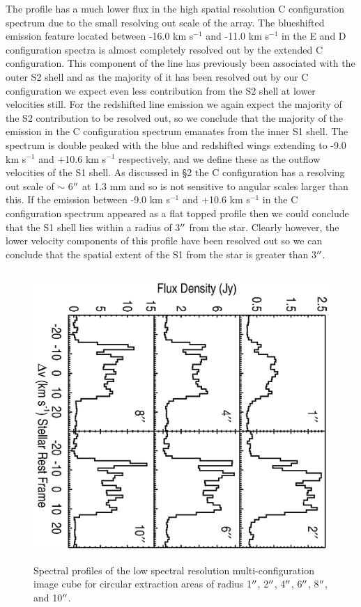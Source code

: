 \documentclass[apj]{emulateapj}
\begin{document}
The profile has a much lower flux in the high spatial resolution C configuration spectrum due to the small resolving out scale of the array. The blueshifted emission feature located between -16.0 km s${}^{-1}$ and -11.0 km s${}^{-1}$ in the E and D configuration spectra is almost completely resolved out by the extended C configuration. This component of the line has previously been associated with the outer S2 shell \citep{1987ApJ...313..400H} and as the majority of it has been resolved out by our C configuration we expect even less contribution from the S2 shell at lower velocities still. For the redshifted line emission we again expect the majority of the S2 contribution to be resolved out, so we conclude that the majority of the emission in the C configuration spectrum emanates from the inner S1 shell. The spectrum is double peaked with the blue and redshifted wings extending to -9.0 km s${}^{-1}$ and +10.6 km s${}^{-1}$ respectively, and we define these as the outflow velocities of the S1 shell. As discussed in \S2 the C configuration has a resolving out scale of $\sim$ 6$\mbox{$^{\prime\prime}$}$ at 1.3 mm and so is not sensitive to angular scales larger than this. If the emission between -9.0 km s${}^{-1}$ and +10.6 km s${}^{-1}$ in the C configuration spectrum appeared as a flat topped profile then we could conclude that the S1 shell lies within a radius of 3$\mbox{$^{\prime\prime}$}$ from the star. Clearly however, the lower velocity components of this profile have been resolved out so we can conclude that the spatial extent of the S1 from the star is greater than 3$\mbox{$^{\prime\prime}$}$. 

\begin{figure}
\includegraphics[scale=0.75, angle=90, width=13.0cm, height=11cm, trim=20pt 50pt 20pt 40pt]{test.eps}
\caption{Spectral profiles of the low spectral resolution multi-configuration image cube for circular extraction areas of radius 1$\mbox{$^{\prime\prime}$}$, 2$\mbox{$^{\prime\prime}$}$, 4$\mbox{$^{\prime\prime}$}$, 6$\mbox{$^{\prime\prime}$}$, 8$\mbox{$^{\prime\prime}$}$, and 10$\mbox{$^{\prime\prime}$}$.}
\label{fig:fig4}
\end{figure}
\end{document}
